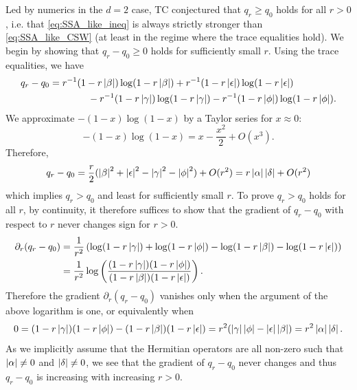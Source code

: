 \documentclass[notitlepage, 10pt]{article}
\begin{document}
\begin{rem}
    {\color{blue}
        Led by numerics in the $d=2$ case, TC conjectured that $q_r \geq q_0$ holds for all $r > 0$, i.e. that \cref{eq:SSA_like_ineq} is always strictly stronger than \cref{eq:SSA_like_CSW} (at least in the regime where the trace equalities hold).
        We begin by showing that $q_{r} - q_{0} \geq 0$ holds for sufficiently small $r$.
        Using the trace equalities, we have
        \begin{align}
            \begin{split}
                q_{r}-q_{0}
                &= r^{-1}(1-r\left|\beta\right|)\log(1-r\left|\beta\right|)+r^{-1}(1-r\left|\epsilon\right|)\log(1-r\left|\epsilon\right|)\\
                &\qquad\qquad-r^{-1}(1-r\left|\gamma\right|)\log(1-r\left|\gamma\right|)-r^{-1}(1-r\left|\phi\right|)\log(1-r\left|\phi\right|).
            \end{split}
        \end{align}
        We approximate $-(1-x)\log(1-x)$ by a Taylor series for $x \approx 0$:
        \begin{equation}
            -(1-x)\log(1-x) = x - \frac{x^2}{2} + O(x^3).
        \end{equation}
        Therefore, 
        \begin{equation}
            q_{r} - q_{0} = \frac{r}{2}(\left|\beta\right|^2 + \left|\epsilon\right|^{2} - \left|\gamma\right|^{2} - \left|\phi\right|^{2}) + O(r^2) = r \left|\alpha\right| \left|\delta\right| + O(r^2)
        \end{equation}
        which implies $q_{r} > q_0$ and least for sufficiently small $r$.
        To prove $q_{r} > q_0$ holds for all $r$, by continuity, it therefore suffices to show that the gradient of $q_{r} - q_{0}$ with respect to $r$ never changes sign for $r > 0$.
        \begin{align}
            \begin{split}
                \partial_{r} (q_{r}-q_{0})
                &= \frac{1}{r^2} \left(\log(1-r\left|\gamma\right|)+\log(1-r\left|\phi\right|)-\log(1-r\left|\beta\right|)-\log(1-r\left|\epsilon\right|) \right)\\
                &= \frac{1}{r^2} \log\left(\frac{(1-r\left|\gamma\right|)(1-r\left|\phi\right|)}{(1-r\left|\beta\right|)(1-r\left|\epsilon\right|)} \right).
            \end{split}
        \end{align}
        Therefore the gradient $\partial_{r} (q_{r}-q_{0})$ vanishes only when the argument of the above logarithm is one, or equivalently when
        \begin{equation}
            0 = (1-r\left|\gamma\right|)(1-r\left|\phi\right|)-(1-r\left|\beta\right|)(1-r\left|\epsilon\right|) = r^2(\left|\gamma\right|\left|\phi\right| - \left|\epsilon\right|\left|\beta\right|) = r^2 \left|\alpha\right|\left|\delta\right|.
        \end{equation}
        As we implicitly assume that the Hermitian operators are all non-zero such that $\left|\alpha\right| \neq 0$ and $\left|\delta\right| \neq 0$, we see that the gradient of $q_{r} - q_{0}$ never changes and thus $q_{r}-q_{0}$ is increasing with increasing $r > 0$.

}
\end{rem}
\end{document}
